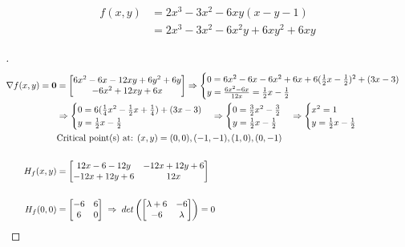 \documentclass[12pt]{article}
\newenvironment{exercise}[2][Exercise]{\begin{trivlist}
\item[\hskip \labelsep {\bfseries #1}\hskip \labelsep {\bfseries #2.}]}{\end{trivlist}}
\begin{document}
\pagebreak
\begin{exercise}{3}
	\begin{align*}
		f(x,y) &= 2x^3 - 3x^2 - 6xy(x - y - 1) \\
		 &= 2x^3 - 3x^2 - 6x^2y + 6xy^2 + 6xy
	\end{align*}
\end{exercise}
\begin{proof}[]
	\begin{align*}
		\nabla f(x,y) = \bm{0} &= \begin{bmatrix} 6x^2 - 6x - 12xy + 6y^2 + 6y \\ - 6x^2 + 12xy + 6x \end{bmatrix} \Rightarrow
		\begin{cases} 0 = 6x^2 - 6x - 6x^2 + 6x + 6(\frac{1}{2}x - \frac{1}{2})^2 + (3x - 3) \\ y = \frac{6x^2 - 6x}{12x} = \frac{1}{2}x - \frac{1}{2} \end{cases} \\
		& \Rightarrow
		\begin{cases} 0 = 6(\frac{1}{4}x^2 - \frac{1}{2}x + \frac{1}{4}) + (3x - 3) \\ y = \frac{1}{2}x - \frac{1}{2} \end{cases}
		\Rightarrow
		\begin{cases} 0 = \frac{3}{2}x^2 - \frac{3}{2} \\ y = \frac{1}{2}x - \frac{1}{2} \end{cases} 
		\Rightarrow
		\begin{cases} x^2 = 1 \\ y = \frac{1}{2}x - \frac{1}{2} \end{cases} \\
		& \textnormal{Critical point(s) at: } (x,y) = (0,0), (-1, -1), (1, 0), (0, -1) \\[15pt]
		H_f(x,y) &= \begin{bmatrix} 12x - 6 -12y & -12x + 12y + 6 \\ -12x + 12y + 6 & 12x \end{bmatrix} \\[15pt]
		H_f(0,0) &= \begin{bmatrix} -6 & 6 \\ 6 & 0 \end{bmatrix} \; \Rightarrow \; det\left( \begin{bmatrix} \lambda + 6 & -6 \\ -6 & \lambda \end{bmatrix} \right) = 0 \\

\end{align*}
\end{proof}
\end{document}
